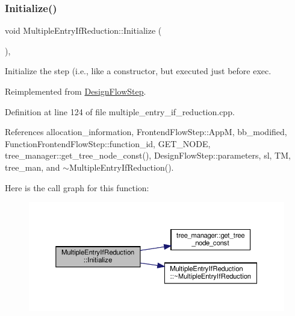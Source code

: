 \subsubsection{\texorpdfstring{Initialize()}{Initialize()}}
{\footnotesize\ttfamily void Multiple\+Entry\+If\+Reduction\+::\+Initialize (\begin{DoxyParamCaption}{ }\end{DoxyParamCaption})\hspace{0.3cm}{\ttfamily [override]}, {\ttfamily [virtual]}}



Initialize the step (i.\+e., like a constructor, but executed just before exec. 



Reimplemented from \hyperlink{classDesignFlowStep_a44b50683382a094976e1d432a7784799}{Design\+Flow\+Step}.



Definition at line 124 of file multiple\+\_\+entry\+\_\+if\+\_\+reduction.\+cpp.



References allocation\+\_\+information, Frontend\+Flow\+Step\+::\+AppM, bb\+\_\+modified, Function\+Frontend\+Flow\+Step\+::function\+\_\+id, G\+E\+T\+\_\+\+N\+O\+DE, tree\+\_\+manager\+::get\+\_\+tree\+\_\+node\+\_\+const(), Design\+Flow\+Step\+::parameters, sl, TM, tree\+\_\+man, and $\sim$\+Multiple\+Entry\+If\+Reduction().

Here is the call graph for this function\+:
\nopagebreak
\begin{figure}[H]
\begin{center}
\leavevmode
\includegraphics[width=350pt]{d3/d5a/classMultipleEntryIfReduction_adbaeee425a62fdee6e6723ce59a4cf2a_cgraph}
\end{center}
\end{figure}
\mbox{\label{classMultipleEntryIfReduction_abde81c971e9b10ba0626e3c068249fbe}} 
